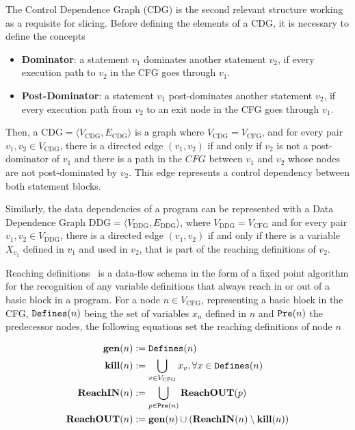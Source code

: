 \documentclass[%
  chapterprefix=false,%
  open=right,%
  twoside=true,%
  paper=a4,%
  logofile={Figures/logo.png},%
  thesistype=master,%
  UKenglish,%
]{se2thesis}
\newcommand{\callable}[2][]{\(\text{\texttt{#2}}(#1)\)}
\begin{document}
The Control Dependence Graph (CDG) is the second relevant structure working as a requisite for slicing.
Before defining the elements of a CDG, it is necessary to define the concepts
\begin{itemize}
  \item \textbf{Dominator}: a statement \(v_1\) dominates another statement \(v_2\), if every execution path to \(v_2\) in the CFG goes through \(v_1\).
  \item \textbf{Post-Dominator}: a statement \(v_1\) post-dominates another statement \(v_2\), if every execution path from \(v_2\) to an exit node in the CFG goes through \(v_1\).
\end{itemize}
Then, a \(\text{CDG} = \langle V_{\text{CDG}}, E_{\text{CDG}} \rangle\) is a graph where \(V_{\text{CDG}} = V_{\text{CFG}}\), and for every pair \(v_1, v_2 \in V_{\text{CDG}}\), there is a directed edge \((v_1, v_2)\) if and only if \(v_2\) is not a post-dominator of \(v_1\) and there is a path in the \(CFG\) between \(v_1\) and \(v_2\) whose nodes are not post-dominated by \(v_2\).
This edge represents a control dependency between both statement blocks.

Similarly, the data dependencies of a program can be represented with a Data Dependence Graph \(\text{DDG} = \langle V_{\text{DDG}}, E_{\text{DDG}} \rangle\), where \(V_{\text{DDG}} = V_{\text{CFG}}\) and for every pair \(v_1, v_2 \in V_{\text{DDG}}\), there is a directed edge \((v_1, v_2)\) if and only if there is a variable \(X_{v_1}\) defined in \(v_1\) and used in \(v_2\), that is part of the reaching definitions of \(v_2\).

Reaching definitions~\cite{DBLP:books/aw/AhoSU86} is a data-flow schema in the form of a fixed point algorithm for the recognition of any variable definitions that always reach in or out of a basic block in a program.
For a node \(n \in V_{\text{CFG}}\), representing a basic block in the CFG, \callable[n]{Defines} being the set of variables \(x_n\) defined in \(n\) and \callable[n]{Pre} the predecessor nodes, the following equations set the reaching definitions of node \(n\)

\begin{align*}
  \text{\textbf{gen}}(n) &:= \text{\callable[n]{Defines}} \\
  \text{\textbf{kill}}(n) &:= \bigcup_{v \in V_{\text{CFG}}} x_v, \forall x \in \text{\callable[n]{Defines}} \\
  \text{\textbf{ReachIN}}(n) &:= \bigcup_{p \in \text{\callable[n]{Pre}}} \text{\textbf{ReachOUT}}(p) \\
  \text{\textbf{ReachOUT}}(n) &:= \text{\textbf{gen}}(n) \cup (\text{\textbf{ReachIN}}(n) \setminus \text{\textbf{kill}}(n))\\
\end{align*}
\end{document}
